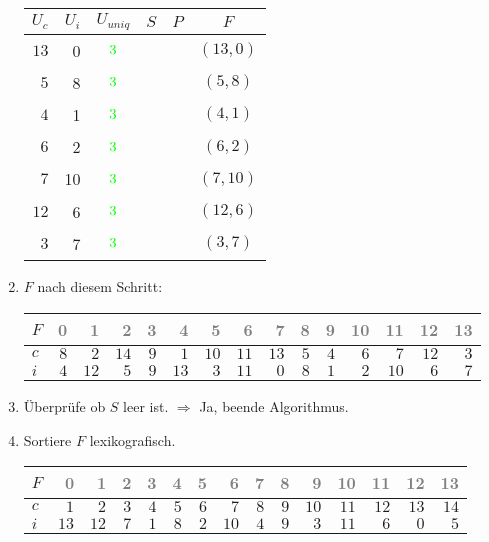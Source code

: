 \begin{enumerate}
\begin{center}
\small\begin{tabular}{rrcccc}
\toprule 
 $U_c$ & $U_i$ & $U_{uniq}$ &     $S$      &   $P$   &   $F$   \\
\midrule 
$13$ & 0 & $$\cmarkc$$  &            &       & $(13, 0)$\\
$ 5$ & 8 & $$\cmarkc$$  &            &       & $( 5, 8)$\\
$ 4$ & 1 & $$\cmarkc$$  &            &       & $( 4, 1)$\\
$ 6$ & 2 & $$\cmarkc$$  &            &       & $( 6, 2)$\\
$ 7$ & 10 & $$\cmarkc$$  &            &       & $( 7,10)$\\
$12$ & 6 & $$\cmarkc$$  &            &       & $(12, 6)$\\
$ 3$ & 7 & $$\cmarkc$$  &            &       & $( 3, 7)$\\
\bottomrule 
\end{tabular}
\end{center}
\item 
$F$ nach diesem Schritt:
\begin{center}
\small\begin{tabular}{lrrrrrrrrrrrrrr}
    \toprule 
    $F$ & \textcolor{gray}{0} & \textcolor{gray}{1} & \textcolor{gray}{2} & \textcolor{gray}{3} & \textcolor{gray}{4} & \textcolor{gray}{5} & \textcolor{gray}{6} & \textcolor{gray}{7} & \textcolor{gray}{8} & \textcolor{gray}{9} & \textcolor{gray}{10} & \textcolor{gray}{11} & \textcolor{gray}{12} & \textcolor{gray}{13}\\
    \midrule 
    $c$ & $8$ & $2$ & $14$ & $9$ & $1$ & $10$ & $11$ & $13$ & $5$ & $4$ & $6$ & $7$ & $12$ & $3$ \\
    $i$ & $4$ & $12$ & $5$ & $9$ & $13$ & $3$ & $11$ & $0$ & $8$ & $1$ & $2$ & $10$ & $6$ & $7$ \\
    \bottomrule 
\end{tabular}
\end{center}

\item 
Überprüfe ob $S$ leer ist.
$\Rightarrow$ Ja, beende Algorithmus.
\item 
Sortiere $F$ lexikografisch.
\begin{center}
\small\begin{tabular}{lrrrrrrrrrrrrrr}
    \toprule 
    $F$ & \textcolor{gray}{0} & \textcolor{gray}{1} & \textcolor{gray}{2} & \textcolor{gray}{3} & \textcolor{gray}{4} & \textcolor{gray}{5} & \textcolor{gray}{6} & \textcolor{gray}{7} & \textcolor{gray}{8} & \textcolor{gray}{9} & \textcolor{gray}{10} & \textcolor{gray}{11} & \textcolor{gray}{12} & \textcolor{gray}{13}\\
    \midrule 
    $c$ & $1$ & $2$ & $3$ & $4$ & $5$ & $6$ & $7$ & $8$ & $9$ & $10$ & $11$ & $12$ & $13$ & $14$ \\
    $i$ & $13$ & $12$ & $7$ & $1$ & $8$ & $2$ & $10$ & $4$ & $9$ & $3$ & $11$ & $6$ & $0$ & $5$ \\
    \bottomrule 
\end{tabular}
\end{center}


\end{enumerate}

